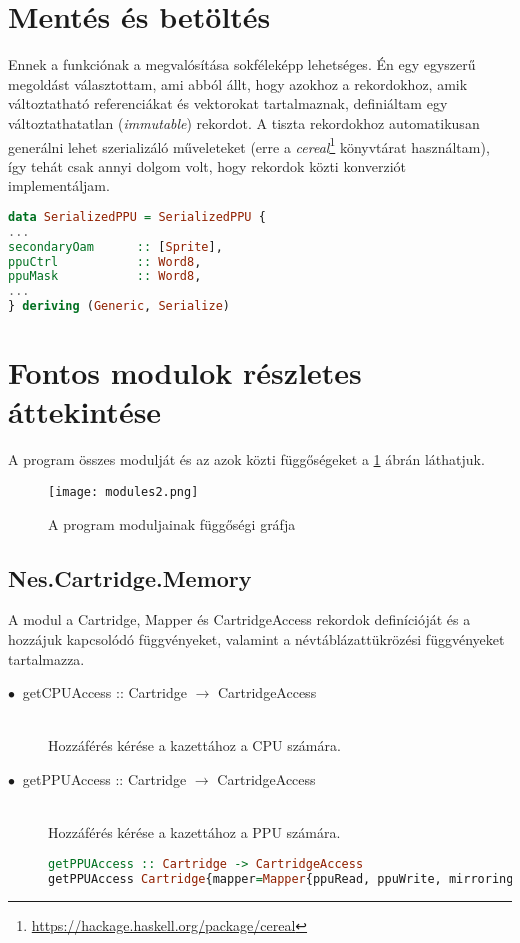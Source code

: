\section{Mentés és betöltés}

Ennek a funkciónak a megvalósítása sokféleképp lehetséges. Én egy egyszerű megoldást választottam, ami abból állt, hogy azokhoz a rekordokhoz, amik változtatható referenciákat és vektorokat tartalmaznak, definiáltam egy változtathatatlan (\emph{immutable}) rekordot. A tiszta rekordokhoz automatikusan generálni lehet szerializáló műveleteket (erre a \emph{cereal}\footnote{\url{https://hackage.haskell.org/package/cereal}} könyvtárat használtam), így tehát csak annyi dolgom volt, hogy rekordok közti konverziót implementáljam.
\vspace{0.3cm}
\begin{lstlisting}[language=Haskell]
data SerializedPPU = SerializedPPU {
...
secondaryOam      :: [Sprite],
ppuCtrl           :: Word8,
ppuMask           :: Word8,
...
} deriving (Generic, Serialize)
\end{lstlisting}

\section{Fontos modulok részletes áttekintése}

A program összes modulját és az azok közti függőségeket a \ref{fig:modules} ábrán láthatjuk.

\begin{figure}[H]
	\centering
	\texttt{[image: modules2.png]}
	\caption{A program moduljainak függőségi gráfja}
	\label{fig:modules}
\end{figure}

\subsection{Nes.Cartridge.Memory}
A modul a Cartridge, Mapper és CartridgeAccess rekordok definícióját és a hozzájuk kapcsolódó függvényeket, valamint a névtáblázattükrözési függvényeket tartalmazza.

\begin{description}
	\item[$\bullet\:$ getCPUAccess :: Cartridge $\rightarrow$ CartridgeAccess] \hfill \\
	Hozzáférés kérése a kazettához a CPU számára.
	\item[$\bullet\:$ getPPUAccess :: Cartridge $\rightarrow$ CartridgeAccess] \hfill \\
	Hozzáférés kérése a kazettához a PPU számára.
\vspace{0.2cm}
\begin{lstlisting}[language=Haskell, basicstyle=\scriptsize]
getPPUAccess :: Cartridge -> CartridgeAccess
getPPUAccess Cartridge{mapper=Mapper{ppuRead, ppuWrite, mirroringFunction}} = CartridgeAccess ppuRead ppuWrite mirroringFunction
\end{lstlisting}
\end{description}

